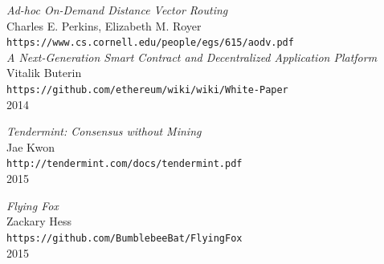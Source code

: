 \documentclass[a4paper]{article}
\begin{document}
\begin{thebibliography}{99}
\emph{Ad-hoc On-Demand Distance Vector Routing}\\
Charles E. Perkins, Elizabeth M. Royer\\
\texttt{https://www.cs.cornell.edu/people/egs/615/aodv.pdf}\\

\emph{A Next-Generation Smart Contract and Decentralized Application Platform}\\
Vitalik Buterin\\
\texttt{https://github.com/ethereum/wiki/wiki/White-Paper}\\
2014

\emph{Tendermint: Consensus without Mining}\\
Jae Kwon\\
\texttt{http://tendermint.com/docs/tendermint.pdf}\\
2015

\emph{Flying Fox}\\
Zackary Hess\\
\texttt{https://github.com/BumblebeeBat/FlyingFox}\\
2015

\end{thebibliography}
\end{document}
